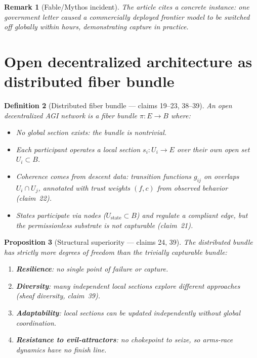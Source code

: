 \documentclass[11pt,a4paper]{article}
\newtheorem{definition}{Definition}[section]
\newtheorem{proposition}[definition]{Proposition}
\newtheorem{remark}[definition]{Remark}
\begin{document}
\begin{remark}[Fable/Mythos incident]
The article cites a concrete instance: one government letter caused a
commercially deployed frontier model to be switched off globally within
hours, demonstrating capture in practice.
\end{remark}

\section{Open decentralized architecture as distributed fiber bundle}
\label{sec:open-decentral}

\begin{definition}[Distributed fiber bundle --- claims 19--23, 38--39]
\label{def:distributed}
An \emph{open decentralized AGI network} is a fiber bundle $\pi : E \to B$
where:
\begin{itemize}
\item No global section exists: the bundle is nontrivial.
\item Each participant operates a local section $s_i : U_i \to E$ over
  their own open set $U_i \subset B$.
\item Coherence comes from descent data: transition functions $g_{ij}$
  on overlaps $U_i \cap U_j$, annotated with trust weights $(f,c)$
  from observed behavior (claim~22).
\item States participate via nodes ($U_{\text{state}} \subset B$) and
  regulate a compliant edge, but the permissionless substrate is
  not capturable (claim~21).
\end{itemize}
\end{definition}

\begin{proposition}[Structural superiority --- claims 24, 39]
\label{prop:superiority}
The distributed bundle has strictly more degrees of freedom than the
trivially capturable bundle:
\begin{enumerate}
\item \textbf{Resilience}: no single point of failure or capture.
\item \textbf{Diversity}: many independent local sections explore
  different approaches (sheaf diversity, claim~39).
\item \textbf{Adaptability}: local sections can be updated independently
  without global coordination.
\item \textbf{Resistance to evil-attractors}: no chokepoint to seize,
  so arms-race dynamics have no finish line.
\end{enumerate}
\end{proposition}
\end{document}
